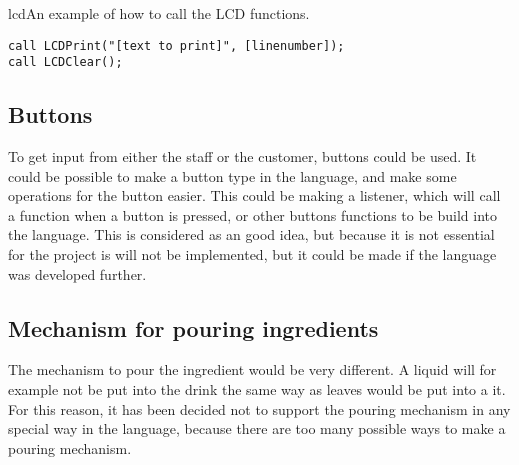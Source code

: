\begin{code}{lcd}{An example of how to call the LCD functions.}
\begin{lstlisting}[mathescape]
call LCDPrint("[text to print]", [linenumber]);
call LCDClear();
\end{lstlisting}
\end{code}

\subsection{Buttons}
To get input from either the staff or the customer, buttons could be used. It could be possible to make a button type in the language, and make some operations for the button easier. This could be making a listener, which will call a function when a button is pressed, or other buttons functions to be build into the language. This is considered as an good idea, but because it is not essential for the project is will not be implemented, but it could be made if the language was developed further.

\subsection{Mechanism for pouring ingredients}
The mechanism to pour the ingredient would be very different. A liquid will for example not be put into the drink the same way as leaves would be put into a it. For this reason, it has been decided not to support the pouring mechanism in any special way in the language, because there are too many possible ways to make a pouring mechanism.